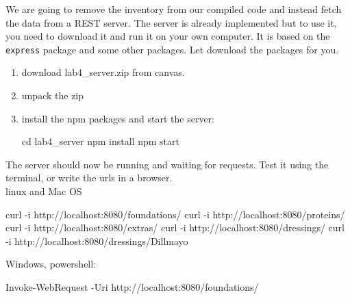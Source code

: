 \documentclass[fleqn, article, a4paper]{memoir}
\begin{document}
\begin{Assignments}

\item We are going to remove the inventory from our compiled code and instead fetch the data from a REST server. The server is already implemented but to use it, you need to download it and run it on your own computer. It is based on the \texttt{express} package and some other packages. Let  download the packages for you.
\begin{enumerate}
  \item download lab4\_server.zip from canvas.
  \item unpack the zip
  \item install the npm packages and start the server:
\begin{Code}
cd lab4_server
npm install
npm start
\end{Code}
\end{enumerate}
The server should now be running and waiting for requests. Test it using the terminal, or write the urls in a browser.
\\linux and Mac OS
\begin{Code}
curl -i http://localhost:8080/foundations/
curl -i http://localhost:8080/proteins/
curl -i http://localhost:8080/extras/
curl -i http://localhost:8080/dressings/
curl -i http://localhost:8080/dressings/Dillmayo
\end{Code}
Windows, powershell: 
\begin{Code}
Invoke-WebRequest -Uri http://localhost:8080/foundations/
\end{Code}



\end{Assignments}
\end{document}
